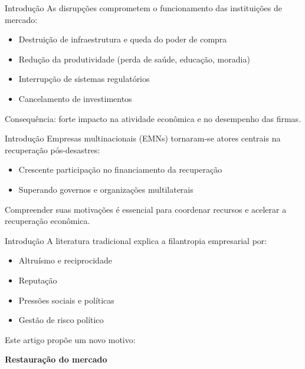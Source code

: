 \documentclass[
  10pt,
  ignorenonframetext,
  aspectratio=169,
  brazilian,
]{beamer}
\providecommand{\tightlist}{%
  \setlength{\itemsep}{0pt}\setlength{\parskip}{0pt}}
\begin{document}
\begin{frame}{Introdução}
\label{introduuxe7uxe3o-1}
As disrupções comprometem o funcionamento das instituições de mercado:

\begin{itemize}
\tightlist
\item
  Destruição de infraestrutura e queda do poder de compra
\item
  Redução da produtividade (perda de saúde, educação, moradia)
\item
  Interrupção de sistemas regulatórios
\item
  Cancelamento de investimentos
\end{itemize}

Consequência: forte impacto na atividade econômica e no desempenho das
firmas.
\end{frame}

\begin{frame}{Introdução}
\label{introduuxe7uxe3o-2}
Empresas multinacionais (EMNs) tornaram-se atores centrais na
recuperação pós-desastres:

\begin{itemize}
\tightlist
\item
  Crescente participação no financiamento da recuperação
\item
  Superando governos e organizações multilaterais
\end{itemize}

Compreender suas motivações é essencial para coordenar recursos e
acelerar a recuperação econômica.
\end{frame}

\begin{frame}{Introdução}
\label{introduuxe7uxe3o-3}
A literatura tradicional explica a filantropia empresarial por:

\begin{itemize}
\tightlist
\item
  Altruísmo e reciprocidade
\item
  Reputação
\item
  Pressões sociais e políticas
\item
  Gestão de risco político
\end{itemize}

Este artigo propõe um novo motivo:

\textbf{Restauração do mercado}
\end{frame}
\end{document}
